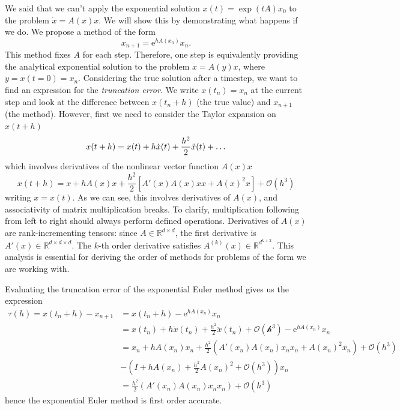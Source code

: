 We said that we can't apply the exponential solution $x(t) = \exp(tA)x_0$ to the problem $\dot{x} = A(x)x$.
We will show this by demonstrating what happens if we do. We propose a method of the form
\begin{equation}
    x_{n+1} = \mathrm{e}^{h A(x_n)}x_n.
\end{equation}
This method fixes $A$ for each step. Therefore, one step is equivalently providing the analytical exponential solution to the problem $\dot{x} = A(y)x$,
where $y = x(t=0) = x_n$.
Considering the true solution after a timestep, we want to find an expression for the \textit{truncation error}.
We write $x(t_n) = x_n$ at the current step and look at the difference between $x(t_n + h)$ (the true value) and $x_{n+1}$ (the method).
However, first we need to consider the Taylor expansion on $x(t + h)$
\begin{equation*}
    x(t+h) = x(t) + h \dot{x}(t) + \frac{h^2}{2}\ddot{x}(t) + \mathellipsis
\end{equation*}
which involves derivatives of the nonlinear vector function $A(x)x$
\begin{equation*}
    x(t+h) = x + h A(x)x + \frac{h^2}{2} \left[ A'(x)A(x)xx + A(x)^2  x \right] + \mathcal{O}(h^3)
\end{equation*}
writing $x = x(t)$.
As we can see, this involves derivatives of $A(x)$, and associativity of matrix multiplication breaks.
To clarify, multiplication following from left to right should always perform defined operations.
Derivatives of $A(x)$ are rank-incrementing tensors: since $A \in \mathds{R}^{d \times d}$,
the first derivative is $A'(x) \in \mathds{R}^{d \times d \times d}$.
The $k$-th order derivative satisfies $A^{(k)}(x) \in \mathds{R}^{d^{k+2}}$.
This analysis is essential for deriving the order of methods for problems of the form we are working with.

Evaluating the truncation error of the exponential Euler method gives us the expression
\begin{equation*}
    \begin{aligned}
        \tau(h) = x(t_n + h) - x_{n+1} &= x(t_n + h) - \mathrm{e}^{h A(x_n)}x_n \\
        &= x(t_n) + h \dot{x}(t_n) + \frac{h^2}{2}\ddot{x}(t_n) + \mathcal{O(h^3)} - \mathrm{e}^{h A(x_n)}x_n \\
        &= x_n + h A(x_n)x_n + \frac{h^2}{2}\left( A'(x_n)A(x_n)x_n x_n + A(x_n)^2 x_n \right) + \mathcal{O}(h^3)\\
         &- \left( I + h A(x_n) + \frac{h^2}{2}A(x_n)^2 + \mathcal{O}(h^3) \right)x_n \\
        &= \frac{h^2}{2} \left( A'(x_n) A(x_n) x_n x_n \right) + \mathcal{O}(h^3)
    \end{aligned}
\end{equation*}
hence the exponential Euler method is first order accurate.

